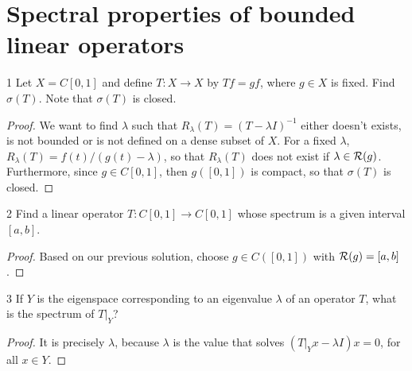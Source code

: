 \section{Spectral properties of bounded linear operators}


\begin{exercise}{1}
Let $X = C[0, 1]$ and define $T: X \to X$ by $Tf = gf$, where $g \in X$ is fixed.
Find $\sigma(T)$.
Note that $\sigma(T)$ is closed.
\end{exercise}
\begin{proof}
We want to find $\lambda$ such that $R_\lambda(T) = (T - \lambda I)^{-1}$ either doesn't exists, is not bounded or is not defined on a dense subset of $X$.
For a fixed $\lambda$, $R_\lambda(T) = f(t) / (g(t) - \lambda)$, so that $R_\lambda(T)$ does not exist if $\lambda \in \mathcal{R}(g)$.
Furthermore, since $g \in C[0, 1]$, then $g([0,1])$ is compact, so that $\sigma(T)$ is closed.
\end{proof} 

\begin{exercise}{2}
Find a linear operator $T: C[0, 1] \to C[0, 1]$ whose spectrum is a given interval $[a, b]$.
\end{exercise}
\begin{proof}
Based on our previous solution, choose $g \in C([0,1])$ with $\mathcal{R}(g) = [a, b]$.
\end{proof} 

\begin{exercise}{3}
If $Y$ is the eigenspace corresponding to an eigenvalue $\lambda$ of an operator $T$, what is the spectrum of $T|_Y$?
\end{exercise}
\begin{proof}
It is precisely $\lambda$, because $\lambda$ is the value that solves $(T|_Y x - \lambda I)x = 0$, for all $x \in Y$.
\end{proof} 


